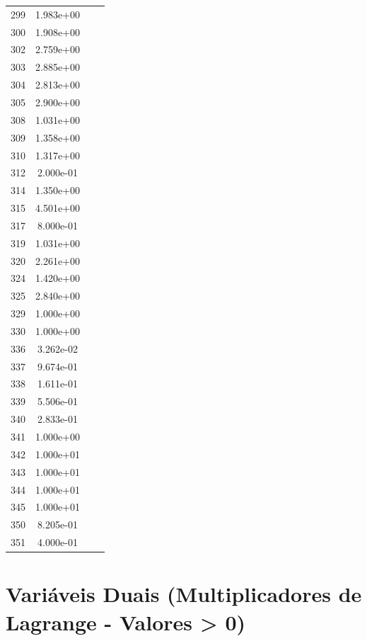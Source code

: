 \documentclass[12pt]{article}
\begin{document}
\begin{longtable}{@{}cccc@{}}
299 & 1.983e+00 &  &  \\
300 & 1.908e+00 &  &  \\
302 & 2.759e+00 &  &  \\
303 & 2.885e+00 &  &  \\
304 & 2.813e+00 &  &  \\
305 & 2.900e+00 &  &  \\
308 & 1.031e+00 &  &  \\
309 & 1.358e+00 &  &  \\
310 & 1.317e+00 &  &  \\
312 & 2.000e-01 &  &  \\
314 & 1.350e+00 &  &  \\
315 & 4.501e+00 &  &  \\
317 & 8.000e-01 &  &  \\
319 & 1.031e+00 &  &  \\
320 & 2.261e+00 &  &  \\
324 & 1.420e+00 &  &  \\
325 & 2.840e+00 &  &  \\
329 & 1.000e+00 &  &  \\
330 & 1.000e+00 &  &  \\
336 & 3.262e-02 &  &  \\
337 & 9.674e-01 &  &  \\
338 & 1.611e-01 &  &  \\
339 & 5.506e-01 &  &  \\
340 & 2.833e-01 &  &  \\
341 & 1.000e+00 &  &  \\
342 & 1.000e+01 &  &  \\
343 & 1.000e+01 &  &  \\
344 & 1.000e+01 &  &  \\
345 & 1.000e+01 &  &  \\
350 & 8.205e-01 &  &  \\
351 & 4.000e-01 &  &  \\

\bottomrule
\end{longtable}


\section{Variáveis Duais (Multiplicadores de Lagrange - Valores > 0)}
\end{document}
